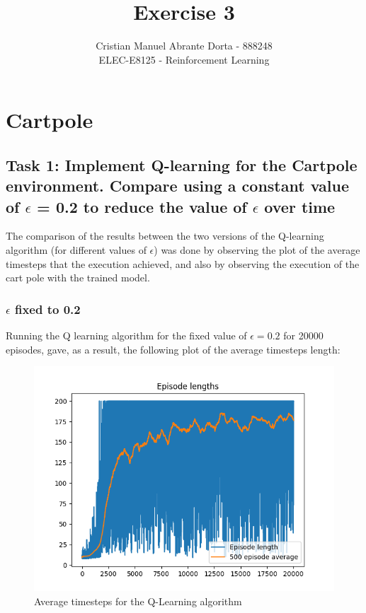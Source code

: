\documentclass[12pt]{article}
\begin{document}
 
\title{Exercise 3}
\author{Cristian Manuel Abrante Dorta - 888248\\
ELEC-E8125 - Reinforcement Learning}

\maketitle
\section{Cartpole}

\subsection{Task 1: Implement Q-learning for the Cartpole environment. Compare using a constant value of $\epsilon$ = 0.2 to reduce the value of $\epsilon$ over time}

The comparison of the results between the two versions of the Q-learning algorithm (for different values of $\epsilon$) was done by observing the plot of the average timesteps that the execution achieved, and also by observing the execution of the cart pole with the trained model.

\subsubsection{$\epsilon$ fixed to 0.2}

Running the Q learning algorithm for the fixed value of $\epsilon=0.2$ for 20000 episodes, gave, as a result, the following plot of the average timesteps length:

\begin{figure}[h]
    \centering
    \includegraphics[scale=0.6]{exercise-3/plots/episodes-fixed-0.2.png}
    \caption{Average timesteps for the Q-Learning algorithm}
    \label{fig:fixed-0.2}
\end{figure}
\end{document}
